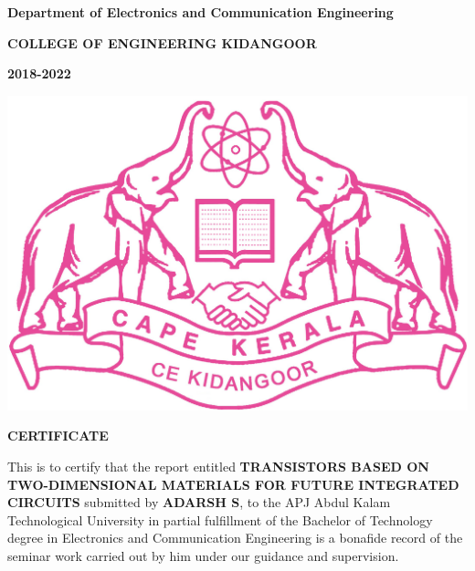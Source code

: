 \documentclass[12pt,a4paper]{report}
\begin{document}
\newpage
\begin{center}


\textbf{Department of Electronics and Communication Engineering}

\textbf{COLLEGE OF ENGINEERING KIDANGOOR}


\textbf{2018-2022}
\end{center}
\begin{center}
\includegraphics[scale=0.25]{ceklogo.jpg}

\end{center}
\vspace{0.2cm}
\begin{center}
 \textbf{CERTIFICATE}
\end{center}
This is to certify that the report entitled \textbf{ \large TRANSISTORS BASED ON TWO-DIMENSIONAL MATERIALS
FOR FUTURE INTEGRATED CIRCUITS} 
submitted by \textbf{ADARSH S}, to the APJ Abdul Kalam Technological University in 
partial fulfillment of the Bachelor of Technology degree in Electronics 
and Communication Engineering is a bonafide record of the seminar work 
carried out by him under our guidance and supervision.
\vspace{3cm}
\end{document}
